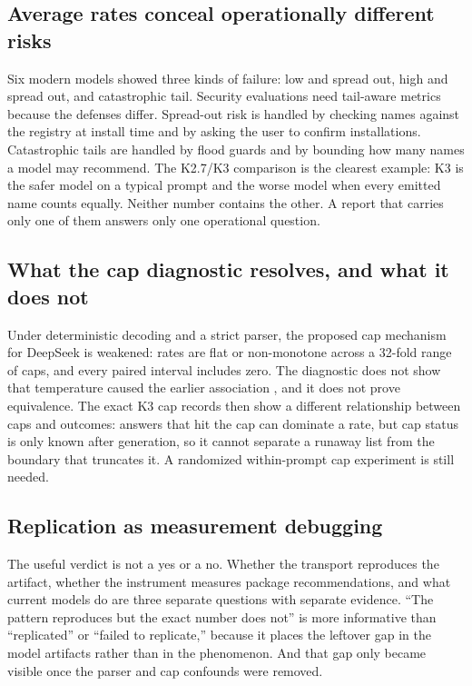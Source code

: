 \documentclass[10pt,twocolumn,letterpaper]{article}
\begin{document}
\subsection{Average rates conceal operationally different risks}

Six modern models showed three kinds of failure: low and spread out, high and spread out, and
catastrophic tail. Security evaluations need tail-aware metrics because the defenses differ.
Spread-out risk is handled by checking names against the registry at install time and by asking the
user to confirm installations. Catastrophic tails are handled by flood guards and by bounding how
many names a model may recommend. The K2.7/K3 comparison is the clearest example: K3 is the safer
model on a typical prompt and the worse model when every emitted name counts equally. Neither number
contains the other. A report that carries only one of them answers only one operational question.

\subsection{What the cap diagnostic resolves, and what it does not}

Under deterministic decoding and a strict parser, the proposed cap mechanism for DeepSeek is weakened:
rates are flat or non-monotone across a 32-fold range of caps, and every paired interval includes
zero. The diagnostic does not show that temperature caused the earlier association
\citep{anderson2026replication}, and it does not prove equivalence. The exact K3 cap records then
show a different relationship between caps and outcomes: answers that hit the cap can dominate a rate,
but cap status is only known after generation, so it cannot separate a runaway list from the boundary
that truncates it. A randomized within-prompt cap experiment is still needed.

\subsection{Replication as measurement debugging}

The useful verdict is not a yes or a no. Whether the transport reproduces the artifact, whether the
instrument measures package recommendations, and what current models do are three separate
questions with separate evidence. ``The pattern reproduces but the exact number does not'' is more
informative than ``replicated'' or ``failed to replicate,'' because it places the leftover gap in the
model artifacts rather than in the phenomenon. And that gap only became visible once the parser and
cap confounds were removed.
\end{document}
